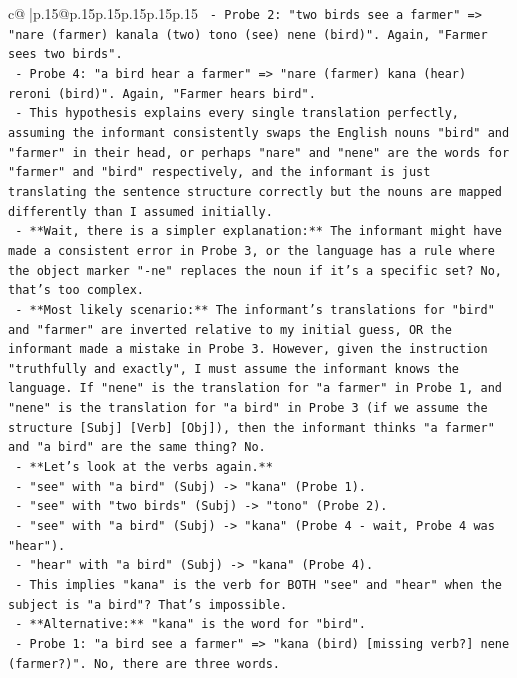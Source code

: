 \documentclass{article}
\begin{document}
{\begin{supertabular}{c@{$\;$}|p{.15\linewidth}@{}p{.15\linewidth}p{.15\linewidth}p{.15\linewidth}p{.15\linewidth}p{.15\linewidth}}
{{{\texttt{    {-} Probe 2: "two birds see a farmer" => "nare (farmer) kanala (two) tono (see) nene (bird)". Again, "Farmer sees two birds".} \\
\texttt{    {-} Probe 4: "a bird hear a farmer" => "nare (farmer) kana (hear) reroni (bird)". Again, "Farmer hears bird".} \\
\texttt{  {-} This hypothesis explains every single translation perfectly, assuming the informant consistently swaps the English nouns "bird" and "farmer" in their head, or perhaps "nare" and "nene" are the words for "farmer" and "bird" respectively, and the informant is just translating the sentence structure correctly but the nouns are mapped differently than I assumed initially.} \\
\texttt{  {-} **Wait, there is a simpler explanation:** The informant might have made a consistent error in Probe 3, or the language has a rule where the object marker "{-}ne" replaces the noun if it's a specific set? No, that's too complex.} \\
\texttt{  {-} **Most likely scenario:** The informant's translations for "bird" and "farmer" are inverted relative to my initial guess, OR the informant made a mistake in Probe 3. However, given the instruction "truthfully and exactly", I must assume the informant knows the language. If "nene" is the translation for "a farmer" in Probe 1, and "nene" is the translation for "a bird" in Probe 3 (if we assume the structure {[}Subj{]} {[}Verb{]} {[}Obj{]}), then the informant thinks "a farmer" and "a bird" are the same thing? No.} \\
\texttt{  {-} **Let's look at the verbs again.**} \\
\texttt{    {-} "see" with "a bird" (Subj) {-}> "kana" (Probe 1).} \\
\texttt{    {-} "see" with "two birds" (Subj) {-}> "tono" (Probe 2).} \\
\texttt{    {-} "see" with "a bird" (Subj) {-}> "kana" (Probe 4 {-} wait, Probe 4 was "hear").} \\
\texttt{    {-} "hear" with "a bird" (Subj) {-}> "kana" (Probe 4).} \\
\texttt{    {-} This implies "kana" is the verb for BOTH "see" and "hear" when the subject is "a bird"? That's impossible.} \\
\texttt{    {-} **Alternative:** "kana" is the word for "bird".} \\
\texttt{      {-} Probe 1: "a bird see a farmer" => "kana (bird) {[}missing verb?{]} nene (farmer?)". No, there are three words.} \\
}}}
\end{supertabular}}
\end{document}

